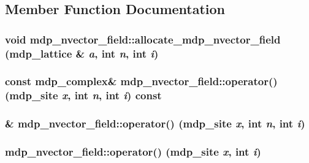 \subsection{Member Function Documentation}
\hypertarget{classmdp__nvector__field_af884aa8d082498c443e33d9765cfa67e}{
\subsubsection[{allocate\_\-mdp\_\-nvector\_\-field}]{\setlength{\rightskip}{0pt plus 5cm}void mdp\_\-nvector\_\-field::allocate\_\-mdp\_\-nvector\_\-field ({\bf mdp\_\-lattice} \& {\em a}, \/  int {\em n}, \/  int {\em i})}}
\label{classmdp__nvector__field_af884aa8d082498c443e33d9765cfa67e}
\hypertarget{classmdp__nvector__field_a956c0f07251a1b0ea3069bc45131e330}{
\subsubsection[{operator()}]{\setlength{\rightskip}{0pt plus 5cm}const {\bf mdp\_\-complex}\& mdp\_\-nvector\_\-field::operator() ({\bf mdp\_\-site} {\em x}, \/  int {\em n}, \/  int {\em i}) const}}
\label{classmdp__nvector__field_a956c0f07251a1b0ea3069bc45131e330}
\hypertarget{classmdp__nvector__field_acc1e3d8cd4ea65935ebb8db11f5df3f4}{
\subsubsection[{operator()}]{\& mdp\_\-nvector\_\-field::operator() ({\bf mdp\_\-site} {\em x}, \/  int {\em n}, \/  int {\em i})}}
\label{classmdp__nvector__field_acc1e3d8cd4ea65935ebb8db11f5df3f4}
\hypertarget{classmdp__nvector__field_afddf6115e2d88a72727d66949436d8ca}{
\subsubsection[{operator()}]{ mdp\_\-nvector\_\-field::operator() ({\bf mdp\_\-site} {\em x}, \/  int {\em i})}}
\label{classmdp__nvector__field_afddf6115e2d88a72727d66949436d8ca}


